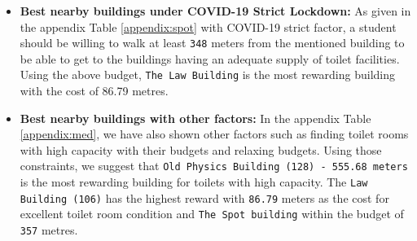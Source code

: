 \begin{itemize}
\item \textbf{Best nearby buildings under COVID-19 Strict Lockdown:} As given in the appendix Table \ref{appendix:spot} with COVID-19 strict factor, a student should be willing to walk at least \texttt{348} meters from the mentioned building to be able to get to the buildings having an adequate supply of toilet facilities. Using the above budget, \texttt{The Law Building} is the most rewarding building with the cost of 86.79 metres.
    


\item \textbf{Best nearby buildings with other factors:} In the appendix Table \ref{appendix:med}, we have also shown other factors such as finding toilet rooms with high capacity with their budgets and relaxing budgets. Using those constraints, we suggest that \texttt{Old Physics Building (128) - 555.68 meters} is the most rewarding building for toilets with high capacity. The \texttt{Law Building (106)} has the highest reward with \texttt{86.79} meters as the cost for excellent toilet room condition and \texttt{The Spot building} within the budget of \texttt{357} metres.


\end{itemize}
